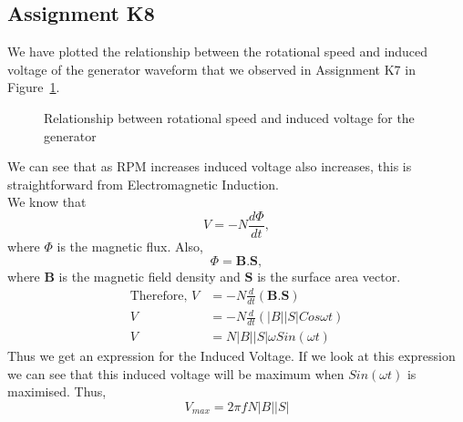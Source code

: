 \documentclass[12pt,a4paper]{report}
\begin{document}
\subsection{Assignment K8}
We have plotted the relationship between the rotational speed and induced voltage of the generator waveform that we observed in Assignment K7 in Figure~\ref{fig:induction}.
\begin{figure}
    \centering
	\caption{Relationship between rotational speed and induced voltage for the generator}\label{fig:induction}
\end{figure}
We can see that as RPM increases induced voltage also increases, this is straightforward from Electromagnetic Induction. \\
We know that \[V=-N\frac{d\Phi}{dt},\] where \(\Phi\) is the magnetic flux. 
Also, \[\Phi=\mathbf{B}.\mathbf{S},\] where \(\mathbf{B}\) is the magnetic field density and \(\mathbf{S}\) is the surface area vector.\\
\begin{align}
	\text{Therefore, } V&=-N\frac{d}{dt}(\mathbf{B}.\mathbf{S})\\
	V&=-N\frac{d}{dt}(|B||S| Cos\omega t)\\
	V&=N|B||S|\omega Sin(\omega t)
\end{align}
Thus we get an expression for the Induced Voltage. If we look at this expression we can see that this induced voltage will be maximum when \(Sin(\omega t)\) is maximised. 
Thus, \begin{equation}
	V_{max}=2\pi f N |B||S|
\end{equation}
\end{document}
